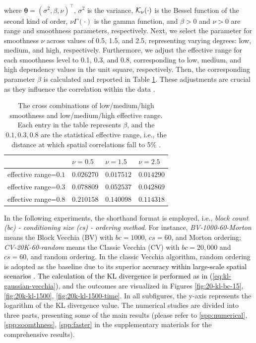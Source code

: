 \documentclass[12pt]{article}
\begin{document}
where ${\boldsymbol\theta} = \left(\sigma^2, \beta, \nu \right)^\top$, $\sigma^2$ is the variance, ${\cal K}_\nu(\cdot)$ is the Bessel function of the second kind of order, $\nu$$\Gamma(\cdot)$ is the gamma function, and $\beta>0$ and $\nu>0$ are range and smoothness parameters, respectively. Next, we select the parameter for smoothness  $\nu$ across values of 0.5, 1.5, and 2.5, representing varying degrees: low, medium, and high, respectively. Furthermore, we adjust the effective range for each smoothness level to 0.1, 0.3, and 0.8, corresponding to low, medium, and high dependency values in the unit square, respectively. Then, the corresponding parameter $\beta$ is calculated and reported in Table \ref{tab:accuracy-setting}. These adjustments are crucial as they influence the correlation within the data \citep{pan2024gpuaccelerated}.

\begin{table}[htbp]
    \caption{The cross combinations of low/medium/high smoothness and low/medium/high effective range. Each entry in the table represents $\beta$, and the $0.1, 0.3, 0.8$ are the statistical effective range, i.e., the distance at which spatial correlations fall to 5\% \citep{huang2021competition}.}
    \centering
    \label{tab:accuracy-setting}
        \begin{tabular}{llll}
        \toprule
                              & $\nu=0.5$                        & $\nu=1.5$                       & $\nu=2.5$                        \\
                              \midrule
        effective range=$0.1$ & $0.026270$  & $0.017512$ & $0.014290$  \\
        effective range=$0.3$ & $0.078809$ & $0.052537$ & $0.042869$  \\
        effective range=$0.8$ & $0.210158$ & $0.140098$ & $0.114318$ \\\bottomrule
        \end{tabular}
\end{table}

In the following experiments, the shorthand format is employed, i.e., \textit{block count (bc) - conditioning size (cs) - ordering method}. For instance, \textit{BV-1000-60-Morton} means the Block Vecchia (BV) with $bc=1000$, $cs=60$, and Morton ordering; \textit{CV-20K-60-random} means the Classic Vecchia (CV) with $bc=20{,}000$ and $cs=60$, and random ordering. In the classic Vecchia algorithm, random ordering is adopted as the baseline due to its superior \textcolor{black}{accuracy within large-scale spatial scenarios \citep{guinness2018permutation, pan2024gpuaccelerated}.}
\textcolor{black}{The calculation of the KL divergence is performed as in (\ref{eq:kl-gaussian-vecchia})}, and the outcomes are visualized in Figures \ref{fig:20-kl-bc-15}, \ref{fig:20k-kl-1500}, \ref{fig:20k-kl-1500-time}. In all subfigures, the y-axis represents the logarithm of the KL divergence value.
The numerical studies are divided into three parts, presenting some of the main results (please refer to \ref{spp:numerical}, \ref{spp:soomthness}, \ref{spp:faster} in the supplementary materials for the comprehensive results). 
\end{document}
